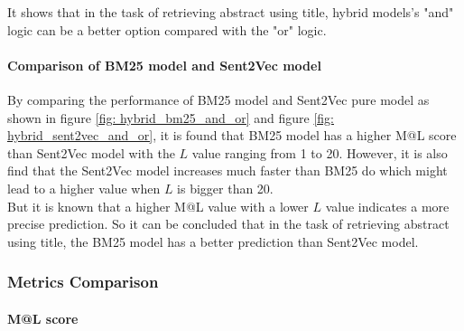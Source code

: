 It shows that in the task of retrieving abstract using title, hybrid models's "and" logic can be a better option compared with the "or" logic.

\paragraph{Comparison of BM25 model and Sent2Vec model}
By comparing the performance of BM25 model and Sent2Vec pure model as shown in figure \ref{fig: hybrid_bm25_and_or} and figure \ref{fig: hybrid_sent2vec_and_or}, it is found that BM25 model has a higher M@L score than Sent2Vec model with the $L$ value ranging from 1 to 20.				
However, it is also find that the Sent2Vec model increases much faster than BM25 do which might lead to a higher value when $L$ is bigger than 20.\\

But it is known that a higher M@L value with a lower $L$ value indicates a more precise prediction. 
So it can be concluded that in the task of retrieving abstract using title, the BM25 model has a better prediction than Sent2Vec model.
\subsubsection{Metrics Comparison}
\paragraph{M@L score}


